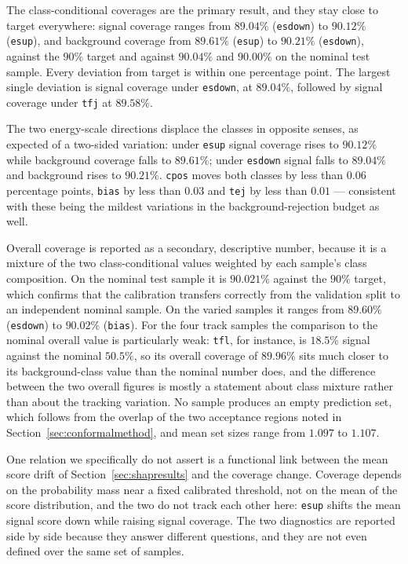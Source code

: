 \documentclass[pdflatex,sn-mathphys,Numbered,iicol]{sn-jnl}
\begin{document}
The class-conditional coverages are the primary result, and they stay close to target
everywhere: signal coverage ranges from $89.04\%$ (\texttt{esdown}) to $90.12\%$
(\texttt{esup}), and background coverage from $89.61\%$ (\texttt{esup}) to $90.21\%$
(\texttt{esdown}), against the $90\%$ target and against $90.04\%$ and $90.00\%$ on the
nominal test sample. Every deviation from target is within one percentage point. The
largest single deviation is signal coverage under \texttt{esdown}, at $89.04\%$,
followed by signal coverage under \texttt{tfj} at $89.58\%$.

The two energy-scale directions displace the classes in opposite senses, as expected of
a two-sided variation: under \texttt{esup} signal coverage rises to $90.12\%$ while
background coverage falls to $89.61\%$; under \texttt{esdown} signal falls to $89.04\%$
and background rises to $90.21\%$. \texttt{cpos} moves both classes by less than
$0.06$ percentage points, \texttt{bias} by less than $0.03$ and \texttt{tej} by less
than $0.01$ --- consistent with these being the mildest variations in the
background-rejection budget as well.

Overall coverage is reported as a secondary, descriptive number, because it is a
mixture of the two class-conditional values weighted by each sample's class
composition. On the nominal test sample it is $90.021\%$ against the $90\%$ target,
which confirms that the calibration transfers correctly from the validation split to an
independent nominal sample. On the varied samples it ranges from $89.60\%$
(\texttt{esdown}) to $90.02\%$ (\texttt{bias}). For the four track samples the
comparison to the nominal overall value is particularly weak: \texttt{tfl}, for
instance, is $18.5\%$ signal against the nominal $50.5\%$, so its overall coverage of
$89.96\%$ sits much closer to its background-class value than the nominal number does,
and the difference between the two overall figures is mostly a statement about class
mixture rather than about the tracking variation. No sample produces an empty
prediction set, which follows from the overlap of the two acceptance regions noted in
Section~\ref{sec:conformalmethod}, and mean set sizes range from $1.097$ to $1.107$.

One relation we specifically do not assert is a functional link between the mean score
drift of Section~\ref{sec:shapresults} and the coverage change. Coverage depends on the
probability mass near a fixed calibrated threshold, not on the mean of the score
distribution, and the two do not track each other here: \texttt{esup} shifts the mean
signal score down while raising signal coverage. The two diagnostics are reported side
by side because they answer different questions, and they are not even defined over the
same set of samples.
\end{document}
